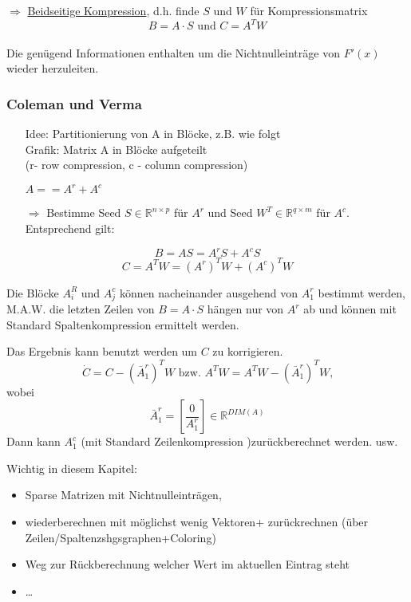 $\Rightarrow$ \underline{Beidseitige Kompression}, d.h. finde $S$ und $W$ für Kompressionsmatrix\\
$$B=A\cdot S \text{ und } C=A^TW$$\\
Die genügend Informationen enthalten um die Nichtnulleinträge von $F'(x)$ wieder herzuleiten.

\subsubsection{Coleman und Verma}
\label{subsubsec:part_row/column_compr}

\begin{itemize}
	\item[Idee:] Partitionierung von A in Blöcke, z.B. wie folgt\\
	Grafik: Matrix A in Blöcke aufgeteilt\\
	(r- row compression, c - column compression)\\
	\vspace{2cm}
	
	$A=$\hspace{6cm}$=A^r+A^c$
	\vspace{2cm}
\end{itemize}
\begin{itemize}
	\item[$\Rightarrow$] Bestimme Seed $S \in \mathbb{R}^{n\times p}$ für $A^r$ und Seed $W^T \in \mathbb{R}^{q\times m}$ für $A^c$.\\
	
	Entsprechend gilt:
\end{itemize}
$$B=AS = A^rS + A^cS$$
$$C = A^TW = (A^r)^TW + (A^c)^TW$$

Die Blöcke $A_i^R$ und $A_j^c$ können nacheinander ausgehend von $A_1^r$ bestimmt werden,\\
M.A.W. die letzten Zeilen von $B=A\cdot S$ hängen nur von $A^r$ ab und können mit Standard Spaltenkompression ermittelt werden.

Das Ergebnis kann benutzt werden um $C$ zu korrigieren.
$$\dot{C} = C- (\bar{A}_1^r)^TW \text{ bzw. }A^TW = A^TW- (\bar{A}_1^r)^TW\text{,}$$
wobei
$$\bar{A}_1^r = \left[\frac{0}{A_1^r}\right] \in \mathbb{R}^{DIM(A)}$$
Dann kann $A_1^c$ (mit Standard Zeilenkompression )zurückberechnet werden. usw.

\noindent\makebox[\linewidth]{\rule{\paperwidth}{0.4pt}}

Wichtig in diesem Kapitel:
\begin{itemize}
	\item Sparse Matrizen mit Nichtnulleinträgen,
	\item wiederberechnen mit möglichst wenig Vektoren+ zurückrechnen (über Zeilen/Spaltenzshgsgraphen+Coloring)
	\item Weg zur Rückberechnung welcher Wert im aktuellen Eintrag steht
	\item \dots
\end{itemize}